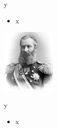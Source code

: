 \documentclass[10pt,
               svgnames,
               hyperref={colorlinks,citecolor=DeepPink4,linkcolor=FireBrick,urlcolor=Maroon},
               usepdftitle=false]{beamer}
\begin{document}
\begin{frame}{y}

\begin{itemize}
\item x
\end{itemize}

\hfill \includegraphics[width=0.2\textwidth]{images/akrylov.jpg}
\end{frame}


\begin{frame}{y}

\begin{itemize}
\item x
\end{itemize}
\end{frame}
\end{document}
